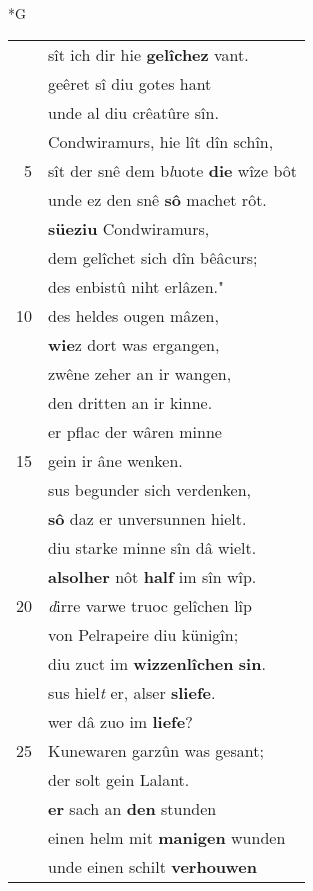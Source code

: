 \documentclass[8pt,a4paper,notitlepage]{article}
\begin{document}
\newpage
\begin{table}[ht]
\begin{minipage}[t]{0.5\linewidth}
\small
\begin{center}*G
\end{center}
\begin{tabular}{rl}
 & sît ich dir hie \textbf{gelîchez} vant.\\ 
 & geêret sî diu gotes hant\\ 
 & unde al diu crêatûre sîn.\\ 
 & Condwiramurs, hie lît dîn schîn,\\ 
5 & sît der snê dem b\textit{l}uote \textbf{die} wîze bôt\\ 
 & unde ez den snê \textbf{sô} machet rôt.\\ 
 & \textbf{süeziu} Condwiramurs,\\ 
 & dem gelîchet sich dîn bêâcurs;\\ 
 & des enbistû niht erlâzen."\\ 
10 & des heldes ougen mâzen,\\ 
 & \textbf{wie}z dort was ergangen,\\ 
 & zwêne zeher an ir wangen,\\ 
 & den dritten an ir kinne.\\ 
 & er pflac der wâren minne\\ 
15 & gein ir âne wenken.\\ 
 & sus begunder sich verdenken,\\ 
 & \textbf{sô} daz er unversunnen hielt.\\ 
 & diu starke minne sîn dâ wielt.\\ 
 & \textbf{al}\textbf{solher} nôt \textbf{half} im sîn wîp.\\ 
20 & \textit{d}irre varwe truoc gelîchen lîp\\ 
 & von Pelrapeire diu künigîn;\\ 
 & diu zuct im \textbf{wizzenlîchen} \textbf{sin}.\\ 
 & sus hiel\textit{t} er, alser \textbf{sliefe}.\\ 
 & wer dâ zuo im \textbf{liefe}?\\ 
25 & Kunewaren garzûn was gesant;\\ 
 & der solt gein Lalant.\\ 
 & \textbf{er} sach an \textbf{den} stunden\\ 
 & einen helm mit \textbf{manigen} wunden\\ 
 & unde einen schilt \textbf{verhouwen}\\ 

\end{tabular}
\end{minipage}
\end{table}
\end{document}
